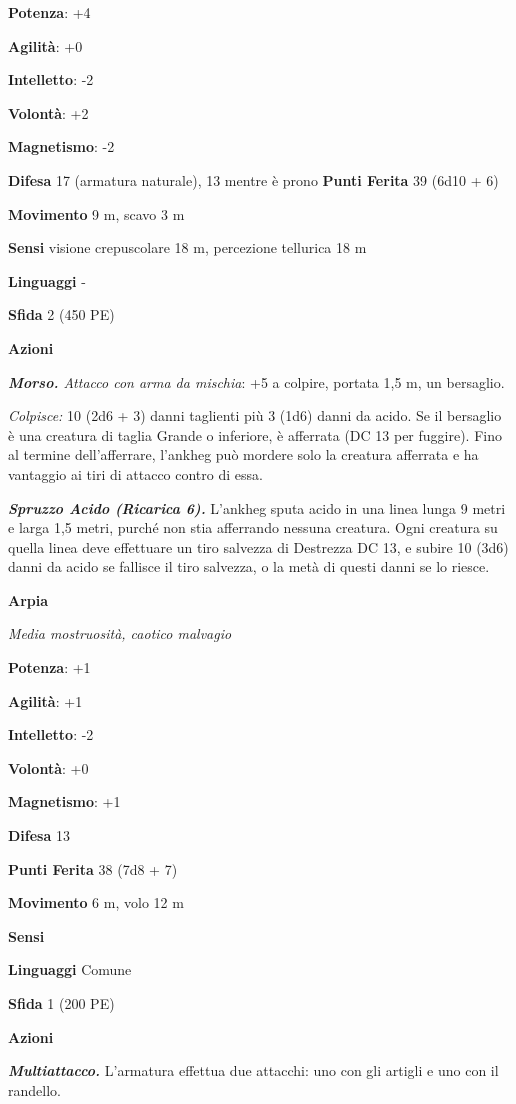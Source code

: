 \begin{multicols}{2}
\textbf{Potenza}: +4

\textbf{Agilità}: +0

\textbf{Intelletto}: -2

\textbf{Volontà}: +2

\textbf{Magnetismo}: -2

\textbf{Difesa} 17 (armatura naturale), 13 mentre è prono
\textbf{Punti Ferita} 39 (6d10 + 6)

\textbf{Movimento} 9 m, scavo 3 m

\textbf{Sensi} visione crepuscolare 18 m, percezione tellurica 18 m

\textbf{Linguaggi} -

\textbf{Sfida} 2 (450 PE)

\textbf{Azioni}

\emph{\textbf{Morso.} Attacco con arma da mischia}: +5 a colpire,
portata 1,5 m, un bersaglio.

\emph{Colpisce:} 10 (2d6 + 3) danni taglienti più 3 (1d6) danni da
acido. Se il bersaglio è una creatura di taglia Grande o inferiore, è
afferrata (DC 13 per fuggire). Fino al termine dell'afferrare, l'ankheg
può mordere solo la creatura afferrata e ha vantaggio ai tiri di attacco
contro di essa.

\emph{\textbf{Spruzzo Acido (Ricarica 6).}} L'ankheg sputa acido in una
linea lunga 9 metri e larga 1,5 metri, purché non stia afferrando
nessuna creatura. Ogni creatura su quella linea deve effettuare un tiro
salvezza di Destrezza DC 13, e subire 10 (3d6) danni da acido se
fallisce il tiro salvezza, o la metà di questi danni se lo riesce.

\textbf{Arpia}

\emph{Media mostruosità, caotico malvagio}

\textbf{Potenza}: +1

\textbf{Agilità}: +1

\textbf{Intelletto}: -2

\textbf{Volontà}: +0

\textbf{Magnetismo}: +1

\textbf{Difesa} 13

\textbf{Punti Ferita} 38 (7d8 + 7)

\textbf{Movimento} 6 m, volo 12 m

\textbf{Sensi} 

\textbf{Linguaggi} Comune

\textbf{Sfida} 1 (200 PE)

\textbf{Azioni}

\emph{\textbf{Multiattacco.}} L'armatura effettua due attacchi: uno con
gli artigli e uno con il randello.


\end{multicols}
